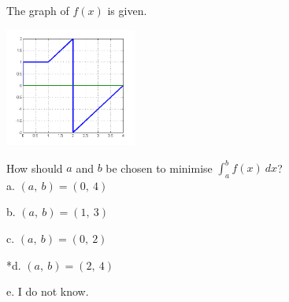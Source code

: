 
The graph of \(f(x)\) is given.

\includegraphics[width=1.71005in,height=1.52489in]{../../Images/IntegralCalculusQ1234.png}

How should \(a\) and \(b\) be chosen to minimise \( \int_a^b f ( x ) \ dx \)?\\


a. \( ( a,\ b ) = ( 0,\ 4 )\)

b. \( ( a,\ b ) = ( 1,\ 3 ) \)

c. \( ( a,\ b ) = (0,\ 2) \)

*d. \( ( a,\ b ) = (2,\ 4) \)

e. I do not know.\\
